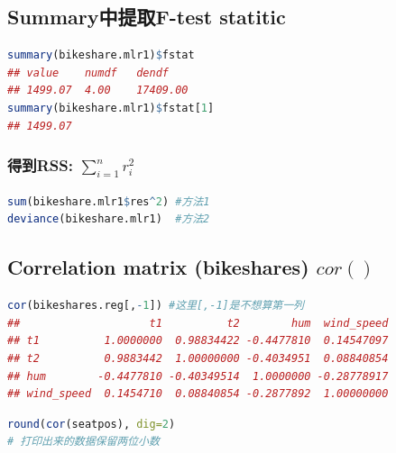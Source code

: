 \documentclass[11pt,a4paper]{article}
\begin{document}
\subsection{Summary中提取F-test statitic}
\begin{lstlisting}[language=R]
summary(bikeshare.mlr1)$fstat
## value    numdf   dendf
## 1499.07  4.00    17409.00
summary(bikeshare.mlr1)$fstat[1]
## 1499.07
\end{lstlisting}
\subsubsection{得到RSS: $\sum_{i=1}^nr_i^2$}
\begin{lstlisting}[language=R]
sum(bikeshare.mlr1$res^2) #方法1
deviance(bikeshare.mlr1)  #方法2
\end{lstlisting}



\subsection{Correlation matrix (bikeshares) $cor()$}
\begin{lstlisting}[language=R]
cor(bikeshares.reg[,-1]) #这里[,-1]是不想算第一列
##                    t1          t2        hum  wind_speed
## t1          1.0000000  0.98834422 -0.4477810  0.14547097
## t2          0.9883442  1.00000000 -0.4034951  0.08840854
## hum        -0.4477810 -0.40349514  1.0000000 -0.28778917
## wind_speed  0.1454710  0.08840854 -0.2877892  1.00000000
\end{lstlisting}

\begin{lstlisting}[language=R]
round(cor(seatpos), dig=2)
# 打印出来的数据保留两位小数
\end{lstlisting}
\end{document}
